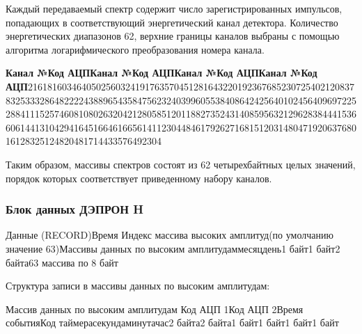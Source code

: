 \documentclass[a4paper,portrait,12pt]{article}
\begin{document}
{{{{Каждый передаваемый спектр содержит число зарегистрированных импульсов, попадающих в соответствующий энергетический канал детектора. Количество энергетических диапазонов 62, верхние границы каналов выбраны с помощью алгоритма логарифмического преобразования номера канала.


\textbf{{\small Канал №Код АЦПКанал №Код АЦПКанал №Код АЦПКанал №Код АЦП}}{\small 216181603464050256032419176357045128164322019236768523072540212083783253332864822224388965435847562324039960553840864242564010245640969722528841115257460810802632042128058512011882735243140859563212962838444153660614413104294164516646166561411230448461792627168151203148047192063768016128325124820481714433576492304}


\begin{flushleft}

\end{flushleft}


Таким образом, массивы спектров состоят из 62 четырехбайтных целых значений, порядок которых соответствует приведенному набору каналов.


\begin{flushleft}
\textbf{\newpage
}
\end{flushleft}


\subsubsection*{\textbf{Блок данных ДЭПРОН H}}

\begin{flushleft}

\end{flushleft}


{\footnotesize Данные (RECORD)Время Индекс массива высоких амплитуд(по умолчанию значение 63)Массивы данных по высоким амплитудаммесяцдень1 байт1 байт2 байта63 массива  по 8 байт}


\begin{flushleft}
Структура записи в массивы данных по высоким амплитудам:
\end{flushleft}


{\footnotesize Массив данных по высоким амплитудам Код АЦП 1Код АЦП 2Время событияКод таймерасекундаминутачас2 байта2 байта1 байт1 байт1 байт1 байт}


\begin{flushleft}

\end{flushleft}


\begin{flushleft}
\newpage


\end{flushleft}}}}}
\end{document}
